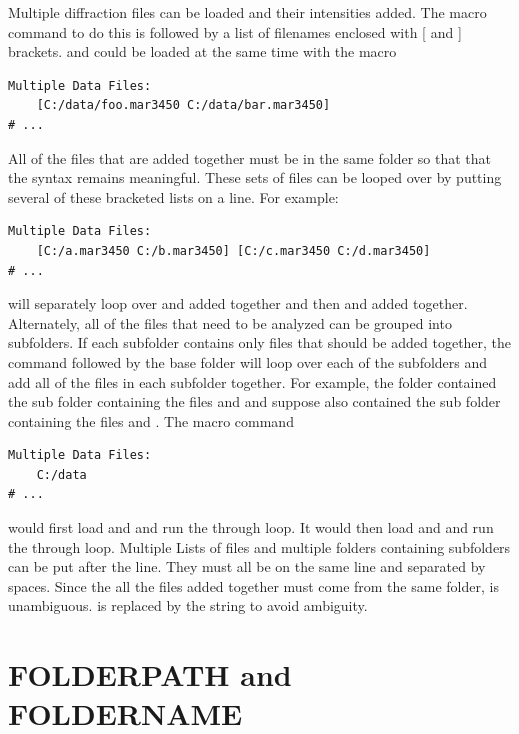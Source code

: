 Multiple diffraction files can be loaded and their 
intensities added. The macro command to do this is
 followed by a list of filenames
enclosed with [ and ] brackets. 
 and
 could be loaded at the
same time with the macro
\begin{lstlisting}
Multiple Data Files:
    [C:/data/foo.mar3450 C:/data/bar.mar3450]
# ...
\end{lstlisting}
All of the files that are added together must be in the same folder
so that that the  syntax remains 
meaningful.
These sets of files can be looped over by putting
several of these bracketed lists on a line.
For example:
\begin{lstlisting}
Multiple Data Files:
    [C:/a.mar3450 C:/b.mar3450] [C:/c.mar3450 C:/d.mar3450]
# ...
\end{lstlisting}
will separately loop over  
and  added together and then 
 and 
added together. Alternately,
all of the files that need to be analyzed can be grouped into 
subfolders. If each subfolder contains only files that should
be added together, the  command
followed by the base folder will loop over each of the subfolders
and add all of the files in each subfolder together.
For example, the folder 
contained the sub folder  containing the files 
 and 
and suppose  also contained the 
sub folder  containing the files
 and .
The macro command
\begin{lstlisting}
Multiple Data Files:
    C:/data
# ...
\end{lstlisting}
would first load  and 
 and run the through loop.
It would then load  and 
 and run the through loop.
Multiple Lists of files and multiple
folders containing subfolders can be put after
the  line. They
must all be on the same line and separated by spaces.
Since the all the files added together must come
from the same folder,  is
unambiguous.  is replaced by the 
string  to avoid ambiguity.

\section{FOLDERPATH and FOLDERNAME}

